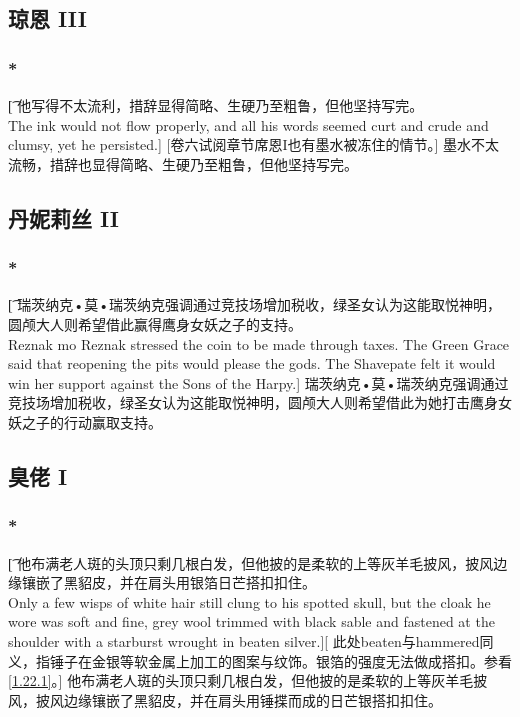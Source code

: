 \documentclass[12pt,a4paper]{article}
\begin{document}
\subsection{琼恩 III}
\subsubsection{\color{red}*}\t[
	他写得不太流利，措辞显得简略、生硬乃至粗鲁，但他坚持写完。\\
	The ink would not flow properly, and all his words seemed curt and crude and clumsy, yet he persisted.]
	[卷六试阅章节席恩I也有墨水被冻住的情节。]
	墨水不太流畅，措辞也显得简略、生硬乃至粗鲁，但他坚持写完。
	
\subsection{丹妮莉丝 II}
\subsubsection{\color{red}*}\t[
	瑞茨纳克•莫•瑞茨纳克强调通过竞技场增加税收，绿圣女认为这能取悦神明，圆颅大人则希望借此赢得鹰身女妖之子的支持。\\
	Reznak mo Reznak stressed the coin to be made through taxes. The Green Grace said that reopening the pits would please the gods. The Shavepate felt it would win her support against the Sons of the Harpy.]
	瑞茨纳克•莫•瑞茨纳克强调通过竞技场增加税收，绿圣女认为这能取悦神明，圆颅大人则希望借此为她打击鹰身女妖之子的行动赢取支持。
	
\subsection{臭佬 I}
\subsubsection{\color{red}*}\label{5.12.1}\t[	
	他布满老人斑的头顶只剩几根白发，但他披的是柔软的上等灰羊毛披风，披风边缘镶嵌了黑貂皮，并在肩头用银箔日芒搭扣扣住。\\
	Only a few wisps of white hair still clung to his spotted skull, but the cloak he wore was soft and fine, grey wool trimmed with black sable and fastened at the shoulder with a starburst wrought in beaten silver.][
	此处beaten与hammered同义，指锤子在金银等软金属上加工的图案与纹饰。银箔的强度无法做成搭扣。参看\ref{1.22.1}。]
	他布满老人斑的头顶只剩几根白发，但他披的是柔软的上等灰羊毛披风，披风边缘镶嵌了黑貂皮，并在肩头用锤揲而成的日芒银搭扣扣住。
	
\end{document}
